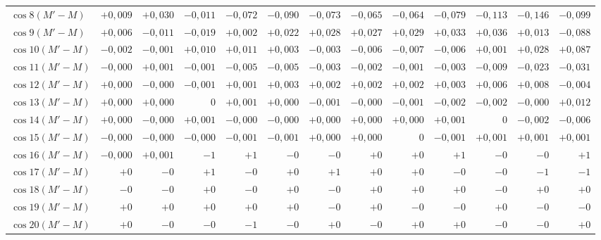 \begin{landscape}
\begin{longtable}{@{}l|r|r|r|r|r|r|r|r|r|r|r|r@{}}
\(\cos 8(M'-M)\) & \(+0{,}009\) & \(+0{,}030\) & \(-0{,}011\) & \(-0{,}072\) & \(-0{,}090\) & \(-0{,}073\) & \(-0{,}065\) & \(-0{,}064\) & \(-0{,}079\) & \(-0{,}113\) & \(-0{,}146\) & \(-0{,}099\)\\
\(\cos 9(M'-M)\) & \(+0{,}006\) & \(-0{,}011\) & \(-0{,}019\) & \(+0{,}002\) & \(+0{,}022\) & \(+0{,}028\) & \(+0{,}027\) & \(+0{,}029\) & \(+0{,}033\) & \(+0{,}036\) & \(+0{,}013\) & \(-0{,}088\)\\
\(\cos 10(M'-M)\) & \(-0{,}002\) & \(-0{,}001\) & \(+0{,}010\) & \(+0{,}011\) & \(+0{,}003\) & \(-0{,}003\) & \(-0{,}006\) & \(-0{,}007\) & \(-0{,}006\) & \(+0{,}001\) & \(+0{,}028\) & \(+0{,}087\)\\
\(\cos 11(M'-M)\) & \(-0{,}000\) & \(+0{,}001\) & \(-0{,}001\) & \(-0{,}005\) & \(-0{,}005\) & \(-0{,}003\) & \(-0{,}002\) & \(-0{,}001\) & \(-0{,}003\) & \(-0{,}009\) & \(-0{,}023\) & \(-0{,}031\)\\
\(\cos 12(M'-M)\) & \(+0{,}000\) & \(-0{,}000\) & \(-0{,}001\) & \(+0{,}001\) & \(+0{,}003\) & \(+0{,}002\) & \(+0{,}002\) & \(+0{,}002\) & \(+0{,}003\) & \(+0{,}006\) & \(+0{,}008\) & \(-0{,}004\)\\
\(\cos 13(M'-M)\) & \(+0{,}000\) & \(+0{,}000\) & \(0\) & \(+0{,}001\) & \(+0{,}000\) & \(-0{,}001\) & \(-0{,}000\) & \(-0{,}001\) & \(-0{,}002\) & \(-0{,}002\) & \(-0{,}000\) & \(+0{,}012\)\\
\(\cos 14(M'-M)\) & \(+0{,}000\) & \(-0{,}000\) & \(+0{,}001\) & \(-0{,}000\) & \(-0{,}000\) & \(+0{,}000\) & \(+0{,}000\) & \(+0{,}000\) & \(+0{,}001\) & \(0\) & \(-0{,}002\) & \(-0{,}006\)\\
\(\cos 15(M'-M)\) & \(-0{,}000\) & \(-0{,}000\) & \(-0{,}000\) & \(-0{,}001\) & \(-0{,}001\) & \(+0{,}000\) & \(+0{,}000\) & \(0\) & \(-0{,}001\) & \(+0{,}001\) & \(+0{,}001\) & \(+0{,}001\)\\
\(\cos 16(M'-M)\) & \(-0{,}000\) & \(+0{,}001\) & \(-1\) & \(+1\) & \(-0\) & \(-0\) & \(+0\) & \(+0\) & \(+1\) & \(-0\) & \(-0\) & \(+1\)\\
\(\cos 17(M'-M)\) & \(+0\) & \(-0\) & \(+1\) & \(-0\) & \(+0\) & \(+1\) & \(+0\) & \(+0\) & \(-0\) & \(-0\) & \(-1\) & \(-1\)\\
\(\cos 18(M'-M)\) & \(-0\) & \(-0\) & \(+0\) & \(-0\) & \(+0\) & \(-0\) & \(+0\) & \(+0\) & \(+0\) & \(-0\) & \(+0\) & \(+0\)\\
\(\cos 19(M'-M)\) & \(+0\) & \(+0\) & \(+0\) & \(+0\) & \(+0\) & \(-0\) & \(+0\) & \(-0\) & \(-0\) & \(+0\) & \(-0\) & \(-0\)\\
\(\cos 20(M'-M)\) & \(+0\) & \(-0\) & \(-0\) & \(-1\) & \(-0\) & \(+0\) & \(-0\) & \(+0\) & \(+0\) & \(-0\) & \(-0\) & \(+0\)\\

\end{longtable}
\end{landscape}
